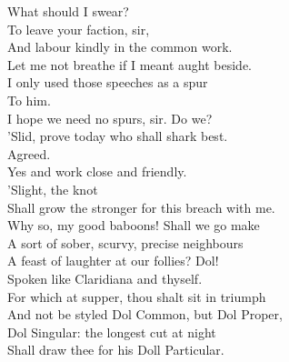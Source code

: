 \documentclass[a4paper,oneside,12pt]{memoir}
\begin{document}
\begin{drama*}
\subtlespeaks What should I swear?\\
\dolspeaks {} To leave your faction, sir,\\
And labour kindly in the common work.\\
\subtlespeaks Let me not breathe if I meant aught beside.\\
I only used those speeches as a spur\\
To him.\\
\dolspeaks {} I hope we need no spurs, sir. Do we?\\
\facespeaks 'Slid, prove today who shall shark best.\\
\subtlespeaks {} Agreed.\\
\dolspeaks Yes and work close and friendly.\\
\subtlespeaks {} 'Slight, the knot\\
Shall grow the stronger for this breach with me.\\
\dolspeaks Why so, my good baboons! Shall we go make\\
A sort of sober, scurvy, precise neighbours\\
A feast of laughter at our follies?
\subtlespeaks {} Dol!\\
Spoken like Claridiana and thyself.\\
\facespeaks For which at supper, thou shalt sit in triumph\\
And not be styled Dol Common, but Dol Proper,\\
Dol Singular: the longest cut at night\\
Shall draw thee for his Doll Particular.\\

\scene


\end{drama*}
\end{document}
